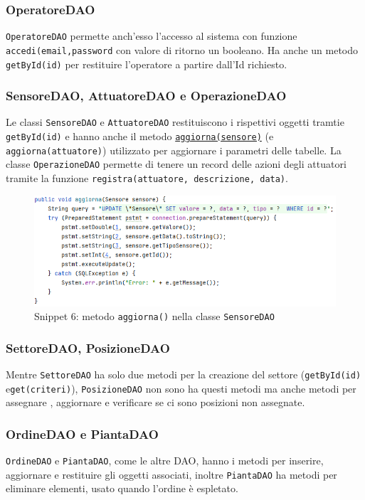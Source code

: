 \documentclass{article}
\newcommand{\code}[1]{\texttt{#1}}
\begin{document}
\subsubsection{OperatoreDAO}
\code{OperatoreDAO} permette anch'esso l'accesso al sistema con funzione \code{accedi(email,password} con valore di ritorno un booleano. Ha anche un metodo \code{getById(id)} per restituire l'operatore a partire dall'Id richiesto.

\subsubsection{SensoreDAO, AttuatoreDAO e OperazioneDAO}
Le classi \code{SensoreDAO} e \code{AttuatoreDAO} restituiscono i rispettivi oggetti tramtie \code{getById(id)} e hanno anche il metodo \hyperref[fig:snippet_sensoreDAOaggiorna]{\code{aggiorna(sensore)}} (e \code{aggiorna(attuatore)}) utilizzato per aggiornare i parametri delle tabelle. La classe \code{OperazioneDAO} permette di tenere un record delle azioni degli attuatori tramite la funzione \code{registra(attuatore, descrizione, data)}.

\begin{figure}[H]
    \centering
    \includegraphics[scale=0.5]{resources/images/Snippets/snippet_sensoreDAOaggiorna.png}
    \captionsetup{labelformat=empty,labelsep=none}
    \caption{Snippet 6: metodo \code{aggiorna()} nella classe \code{SensoreDAO}}
    \label{fig:snippet_sensoreDAOaggiorna}
\end{figure}

\subsubsection{SettoreDAO, PosizioneDAO}
Mentre \code{SettoreDAO} ha solo due metodi per la creazione del settore (\code{getById(id)} e\code{get(criteri)}), \code{PosizioneDAO} non sono ha questi metodi ma anche metodi per assegnare , aggiornare e verificare se ci sono posizioni non assegnate.

\subsubsection{OrdineDAO e PiantaDAO}
\code{OrdineDAO} e \code{PiantaDAO}, come le altre DAO, hanno i metodi per inserire, aggiornare e restituire gli oggetti associati, inoltre \code{PiantaDAO} ha metodi per eliminare elementi, usato quando l'ordine è espletato.
\end{document}
